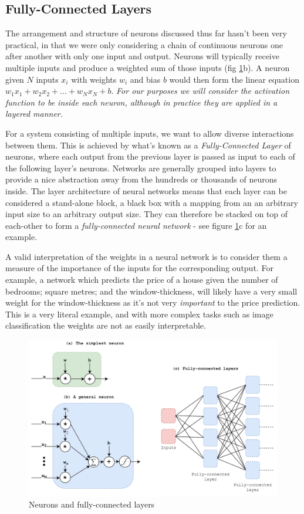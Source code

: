 \documentclass{report}
\begin{document}
	\subsection{Fully-Connected Layers} \label{fully-connected:1}
	The arrangement and structure of neurons discussed thus far hasn't been very practical, in that we were only considering a chain of continuous neurons one after another with only one input and output. Neurons will typically receive multiple inputs and produce a weighted sum of those inputs (fig \ref{fig:neurons:1}b). A neuron given $N$ inputs $x_i$ with weights $w_i$ and bias $b$ would then form the linear equation $w_1x_1 + w_2x_2 + ... + w_Nx_N + b$. \textit{For our purposes we will consider the activation function to be inside each neuron, although in practice they are applied in a layered manner.} \par
	For a system consisting of multiple inputs, we want to allow diverse interactions between them. This is achieved by what's known as a \textit{Fully-Connected Layer} of neurons, where each output from the previous layer is passed as input to each of the following layer's neurons. Networks are generally grouped into layers to provide a nice abstraction away from the hundreds or thousands of neurons inside. The layer architecture of neural networks means that each layer can be considered a stand-alone block, a black box with a mapping from an an arbitrary input size to an arbitrary output size. They can therefore be stacked on top of each-other to form a \textit{fully-connected neural network} - see figure \ref{fig:neurons:1}c for an example. \par
	A valid interpretation of the weights in a neural network is to consider them a measure of the importance of the inputs for the corresponding output. For example, a network which predicts the price of a house given the number of bedrooms; square metres; and the window-thickness, will likely have a very small weight for the window-thickness as it's not very \textit{important} to the price prediction. This is a very literal example, and with more complex tasks such as image classification the weights are not as easily interpretable. \par
	\begin{figure}[h]
		\centering
		\includegraphics[width=14cm]{neurons}
		\caption{Neurons and fully-connected layers}
		\label{fig:neurons:1}
	\end{figure}
\end{document}
